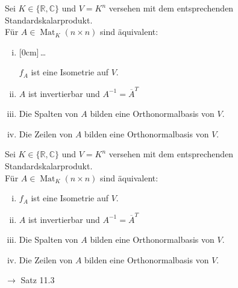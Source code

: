 \documentclass[11pt]{article}
\renewcommand{\cite}[1]{\par\bigskip\hfill{\color{gray}\tiny\(\to\) #1}}
\newcommand{\CC}{\mathbb{C}}
\newcommand{\RR}{\mathbb{R}}
\DeclareMathOperator{\Mat}{Mat}
\newcommand{\hide}[1]{\parbox{0cm}{\raisebox{-7pt}[0cm]{\dots}}\color{white}#1\color{black}}
\let\olddots\dots
\renewcommand{\dots}{\,\olddots\,}
\newenvironment{field}{}{\newpage}
\newif\ifnote
\newenvironment{note}{\notetrue}{\notefalse}
\newcommand{\localtag}{}
\newcommand{\globaltag}{}
\newcommand{\uuid}{}
\newcommand{\tags}[1]{
    \ifnote
        \renewcommand{\localtag}{#1}
    \else
        \renewcommand{\globaltag}{#1}
    \fi
    }
\newcommand{\xplain}[1]{\renewcommand{\uuid}{#1}}
\begin{document}
\begin{note}
    \tags{Satz}
    \xplain{59a91c62-bf03-11ec-9d64-0242ac120002}

    \begin{field} %
        Sei \(K\in\{\RR,\CC\}\) und \(V=K^n\) versehen mit dem entsprechenden Standardskalarprodukt.\\
        Für \(A\in \Mat_K(n\times n)\) sind äquivalent:
        \begin{enumerate}[(i)]
            \item \hide{\(f_A\) ist eine Isometrie auf \(V\).}
            \item \(A\) ist invertierbar und \(A^{-1}=\overline{A}^T\)
            \item Die Spalten von \(A\) bilden eine Orthonormalbasis von \(V\).
            \item Die Zeilen von \(A\) bilden eine Orthonormalbasis von \(V\).
        \end{enumerate}
    \end{field}
    \begin{field}
        Sei \(K\in\{\RR,\CC\}\) und \(V=K^n\) versehen mit dem entsprechenden Standardskalarprodukt.\\
        Für \(A\in \Mat_K(n\times n)\) sind äquivalent:
        \begin{enumerate}[(i)]
            \item \(f_A\) ist eine Isometrie auf \(V\).
            \item \(A\) ist invertierbar und \(A^{-1}=\overline{A}^T\)
            \item Die Spalten von \(A\) bilden eine Orthonormalbasis von \(V\).
            \item Die Zeilen von \(A\) bilden eine Orthonormalbasis von \(V\).
        \end{enumerate}
        \cite{Satz 11.3}
    \end{field}


\end{note}
\end{document}
